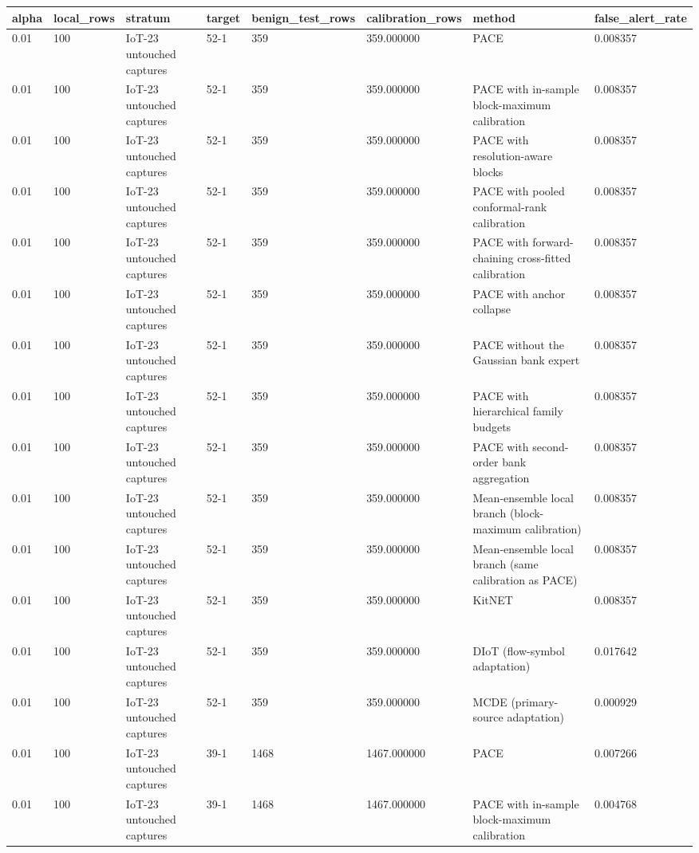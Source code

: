 \begin{tabular}{llllllll}
\toprule
alpha & local\_rows & stratum & target & benign\_test\_rows & calibration\_rows & method & false\_alert\_rate \\
\midrule
0.01 & 100 & IoT-23 untouched captures & 52-1 & 359 & 359.000000 & PACE & 0.008357 \\
0.01 & 100 & IoT-23 untouched captures & 52-1 & 359 & 359.000000 & PACE with in-sample block-maximum calibration & 0.008357 \\
0.01 & 100 & IoT-23 untouched captures & 52-1 & 359 & 359.000000 & PACE with resolution-aware blocks & 0.008357 \\
0.01 & 100 & IoT-23 untouched captures & 52-1 & 359 & 359.000000 & PACE with pooled conformal-rank calibration & 0.008357 \\
0.01 & 100 & IoT-23 untouched captures & 52-1 & 359 & 359.000000 & PACE with forward-chaining cross-fitted calibration & 0.008357 \\
0.01 & 100 & IoT-23 untouched captures & 52-1 & 359 & 359.000000 & PACE with anchor collapse & 0.008357 \\
0.01 & 100 & IoT-23 untouched captures & 52-1 & 359 & 359.000000 & PACE without the Gaussian bank expert & 0.008357 \\
0.01 & 100 & IoT-23 untouched captures & 52-1 & 359 & 359.000000 & PACE with hierarchical family budgets & 0.008357 \\
0.01 & 100 & IoT-23 untouched captures & 52-1 & 359 & 359.000000 & PACE with second-order bank aggregation & 0.008357 \\
0.01 & 100 & IoT-23 untouched captures & 52-1 & 359 & 359.000000 & Mean-ensemble local branch (block-maximum calibration) & 0.008357 \\
0.01 & 100 & IoT-23 untouched captures & 52-1 & 359 & 359.000000 & Mean-ensemble local branch (same calibration as PACE) & 0.008357 \\
0.01 & 100 & IoT-23 untouched captures & 52-1 & 359 & 359.000000 & KitNET & 0.008357 \\
0.01 & 100 & IoT-23 untouched captures & 52-1 & 359 & 359.000000 & DIoT (flow-symbol adaptation) & 0.017642 \\
0.01 & 100 & IoT-23 untouched captures & 52-1 & 359 & 359.000000 & MCDE (primary-source adaptation) & 0.000929 \\
0.01 & 100 & IoT-23 untouched captures & 39-1 & 1468 & 1467.000000 & PACE & 0.007266 \\
0.01 & 100 & IoT-23 untouched captures & 39-1 & 1468 & 1467.000000 & PACE with in-sample block-maximum calibration & 0.004768 \\

\end{tabular}
